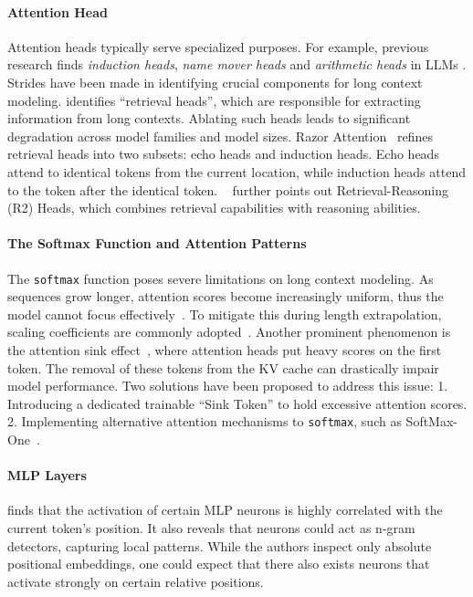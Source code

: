 \documentclass[11pt, a4paper, logo, copyright, nonumbering]{map}
\begin{document}
\paragraph{Attention Head}
Attention heads typically serve specialized purposes. For example, previous research finds \textit{induction heads}, \textit{name mover heads} and \textit{arithmetic heads} in LLMs \citep{anthropic_induction_heads,wang_interpretability_wild_2023,arith_head_icml}.
Strides have been made in identifying crucial components for long context modeling. 
\citet{wu2025retrieval_head} identifies ``retrieval heads'', which are responsible for extracting information from long contexts. 
Ablating such heads leads to significant degradation across model families and model sizes.
Razor Attention~\citep{tang2024razorattention} refines retrieval heads into two subsets: echo heads and induction heads. Echo heads attend to identical tokens from the current location, while induction heads attend to the token after the identical token. ~\citet{fu2025not} further points out Retrieval-Reasoning (R2) Heads, which combines retrieval capabilities with reasoning abilities.

\paragraph{The Softmax Function and Attention Patterns}
The \texttt{softmax} function poses severe limitations on long context modeling.
As sequences grow longer, attention scores become increasingly uniform, thus the model cannot focus effectively~\citep{han-etal-2024-lm}. To mitigate this during length extrapolation, scaling coefficients are commonly adopted~\citep{peng2023yarn}.
Another prominent phenomenon is the attention sink effect~\citep{attn_sink}, where attention heads put heavy scores on the first token. The removal of these tokens from the KV cache can drastically impair model performance. 
Two solutions have been proposed to address this issue:
1. Introducing a dedicated trainable ``Sink Token'' to hold excessive attention scores.
2. Implementing alternative attention mechanisms to \texttt{softmax}, such as SoftMax-One~\citep{attn_off_by_one}.
\paragraph{MLP Layers}
\citet{voita-etal-2024-neurons_func} finds that the activation of certain MLP neurons is highly correlated with the current token's position. It also reveals that neurons could act as n-gram detectors, capturing local patterns. While the authors inspect only absolute positional embeddings, one could expect that there also exists neurons that activate strongly on certain relative positions.
\end{document}
